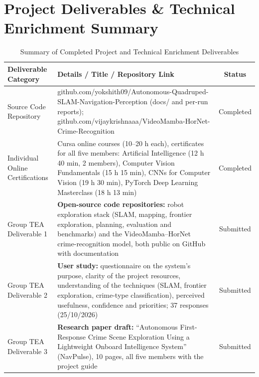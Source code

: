 \documentclass[11pt, a4paper]{article}
\begin{document}
\section{Project Deliverables \& Technical Enrichment Summary}
\begin{table}[H]
    \centering
    \footnotesize
    \renewcommand{\arraystretch}{1.2}
    \begin{tabular}{|p{4.2cm}|p{7.5cm}|c|}
        \hline
        \textbf{Deliverable Category} & \textbf{Details / Title / Repository Link} & \textbf{Status} \\
        \hline
        Source Code Repository & github.com/yokshith09/Autonomous-Quadruped-SLAM-Navigation-Perception (docs/ and per-run reports); github.com/vijaykrishnaaa/VideoMamba-HorNet-Crime-Recognition & Completed \\
        \hline
        Individual Online Certifications & Cursa online courses (10--20 h each), certificates for all five members: Artificial Intelligence (12 h 40 min, 2 members), Computer Vision Fundamentals (15 h 15 min), CNNs for Computer Vision (19 h 30 min), PyTorch Deep Learning Masterclass (18 h 13 min) & Completed \\
        \hline
        Group TEA Deliverable 1 & \textbf{Open-source code repositories:} robot exploration stack (SLAM, mapping, frontier exploration, planning, evaluation and benchmarks) and the VideoMamba--HorNet crime-recognition model, both public on GitHub with documentation & Submitted \\
        \hline
        Group TEA Deliverable 2 & \textbf{User study:} questionnaire on the system's purpose, clarity of the project resources, understanding of the techniques (SLAM, frontier exploration, crime-type classification), perceived usefulness, confidence and priorities; 37 responses (25/10/2026) & Submitted \\
        \hline
        Group TEA Deliverable 3 & \textbf{Research paper draft:} ``Autonomous First-Response Crime Scene Exploration Using a Lightweight Onboard Intelligence System'' (NavPulse), 10 pages, all five members with the project guide & Submitted \\
        \hline
    \end{tabular}
    \caption{Summary of Completed Project and Technical Enrichment Deliverables}
\end{table}

\vspace{0.2cm}
\nocite{*}
\renewcommand{\refname}{\large\bfseries\color{amritaMaroon}References}


\end{document}
